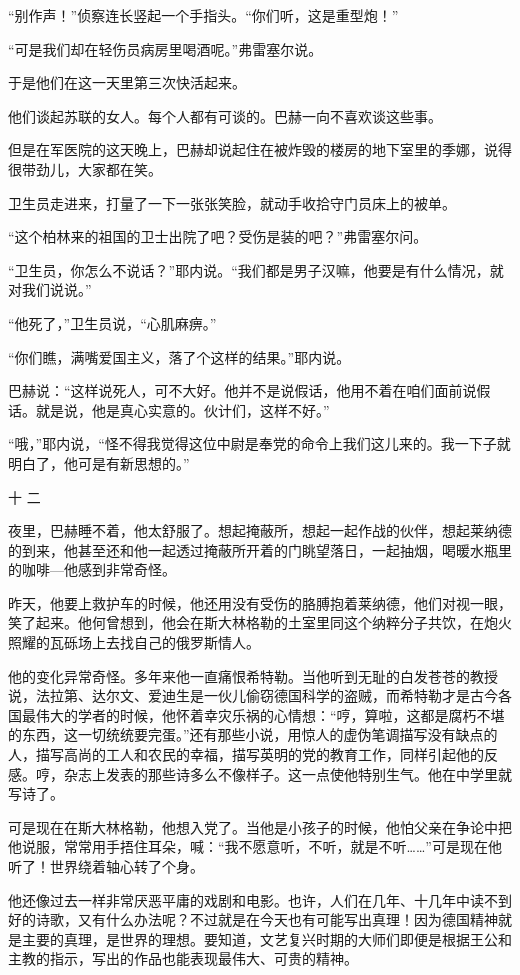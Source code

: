 “别作声！”侦察连长竖起一个手指头。“你们听，这是重型炮！”

“可是我们却在轻伤员病房里喝酒呢。”弗雷塞尔说。

于是他们在这一天里第三次快活起来。

他们谈起苏联的女人。每个人都有可谈的。巴赫一向不喜欢谈这些事。

但是在军医院的这天晚上，巴赫却说起住在被炸毁的楼房的地下室里的季娜，说得很带劲儿，大家都在笑。

卫生员走进来，打量了一下一张张笑脸，就动手收拾守门员床上的被单。

“这个柏林来的祖国的卫士出院了吧？受伤是装的吧？”弗雷塞尔问。

“卫生员，你怎么不说话？”耶内说。“我们都是男子汉嘛，他要是有什么情况，就对我们说说。”

“他死了，”卫生员说，“心肌麻痹。”

“你们瞧，满嘴爱国主义，落了个这样的结果。”耶内说。

巴赫说：“这样说死人，可不大好。他并不是说假话，他用不着在咱们面前说假话。就是说，他是真心实意的。伙计们，这样不好。”

“哦，”耶内说，“怪不得我觉得这位中尉是奉党的命令上我们这儿来的。我一下子就明白了，他可是有新思想的。”

十 二

夜里，巴赫睡不着，他太舒服了。想起掩蔽所，想起一起作战的伙伴，想起莱纳德的到来，他甚至还和他一起透过掩蔽所开着的门眺望落日，一起抽烟，喝暖水瓶里的咖啡—他感到非常奇怪。

昨天，他要上救护车的时候，他还用没有受伤的胳膊抱着莱纳德，他们对视一眼，笑了起来。他何曾想到，他会在斯大林格勒的土室里同这个纳粹分子共饮，在炮火照耀的瓦砾场上去找自己的俄罗斯情人。

他的变化异常奇怪。多年来他一直痛恨希特勒。当他听到无耻的白发苍苍的教授说，法拉第、达尔文、爱迪生是一伙儿偷窃德国科学的盗贼，而希特勒才是古今各国最伟大的学者的时候，他怀着幸灾乐祸的心情想：“哼，算啦，这都是腐朽不堪的东西，这一切统统要完蛋。”还有那些小说，用惊人的虚伪笔调描写没有缺点的人，描写高尚的工人和农民的幸福，描写英明的党的教育工作，同样引起他的反感。哼，杂志上发表的那些诗多么不像样子。这一点使他特别生气。他在中学里就写诗了。

可是现在在斯大林格勒，他想入党了。当他是小孩子的时候，他怕父亲在争论中把他说服，常常用手捂住耳朵，喊：“我不愿意听，不听，就是不听……”可是现在他听了！世界绕着轴心转了个身。

他还像过去一样非常厌恶平庸的戏剧和电影。也许，人们在几年、十几年中读不到好的诗歌，又有什么办法呢？不过就是在今天也有可能写出真理！因为德国精神就是主要的真理，是世界的理想。要知道，文艺复兴时期的大师们即便是根据王公和主教的指示，写出的作品也能表现最伟大、可贵的精神。

